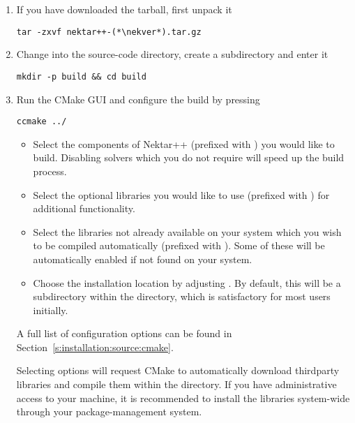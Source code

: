 \begin{enumerate}
    \item If you have downloaded the tarball, first unpack it
    \begin{lstlisting}[style=BashInputStyle]
tar -zxvf nektar++-(*\nekver*).tar.gz
    \end{lstlisting}

    \item Change into the source-code directory, create a 
    subdirectory and enter it
    \begin{lstlisting}[style=BashInputStyle]
    mkdir -p build && cd build
    \end{lstlisting}

    \item Run the CMake GUI and configure the build by pressing 
    \begin{lstlisting}[style=BashInputStyle]
    ccmake ../
    \end{lstlisting}
    \begin{itemize}
        \item Select the components of Nektar++ (prefixed with
        ) you would like to build. Disabling solvers
        which you do not require will speed up the build process.
        \item Select the optional libraries you would like to use (prefixed with
        ) for additional functionality.
        \item Select the libraries not already available on your system which
        you wish to be compiled automatically (prefixed with
        ). Some of these will be automatically enabled if not found on your system.
        \item Choose the installation location by adjusting . By default, this will be a  subdirectory within the  directory, which is satisfactory for most users initially.
    \end{itemize}
    A full list of configuration options can be found in
    Section~\ref{s:installation:source:cmake}.

    \begin{notebox}
    Selecting  options will request CMake to
    automatically download thirdparty libraries and compile them within the
    \nekpp directory. If you have administrative access to your machine, it is
    recommended to install the libraries system-wide through your
    package-management system.\\[3pt]


\end{notebox}
\end{enumerate}
